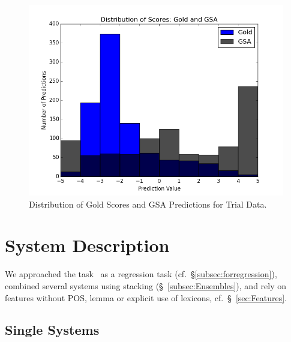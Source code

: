 \documentclass[11pt,letterpaper]{article}
\begin{document}
\begin{figure}[ht!]
    \centering
    \includegraphics[width=\columnwidth]{gold_gsa_distributions3.png}%
    \caption{Distribution of Gold Scores and GSA Predictions for Trial Data.}
    \label{fig:TrialGoldGSADist}
\end{figure}



\section{System Description}
We approached the task~\cite{semevalTask11} as a regression task (cf.\ \S \ref{subsec:forregression}), combined several systems using stacking (\S~\ref{subsec:Ensembles}), and rely on features without POS, lemma or explicit use of lexicons, cf.\ \S~\ref{sec:Features}. %


\subsection{Single Systems}
\label{subsec:SingleSystems}
\end{document}
